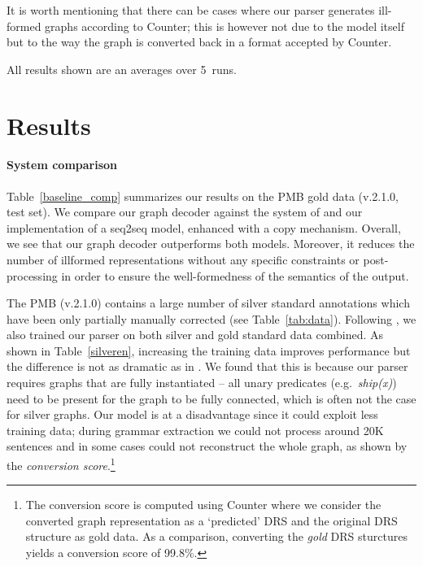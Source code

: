 \documentclass[11pt,a4paper]{article}
\theoremstyle{plain}
\begin{document}
It is worth mentioning that there can be cases where our parser generates ill-formed graphs according to Counter; this is however not due to the model itself but to the way the graph is converted back in a format accepted by Counter.

All results shown are an averages over 5~runs.

\section{Results}
\label{sec:results}

\paragraph{System comparison}
Table~\ref{baseline_comp} summarizes our results on the PMB gold data
(v.2.1.0, test set). We compare our graph decoder against the system
of \citet{van2018exploring} and our implementation of a seq2seq model,
enhanced with a copy mechanism. Overall, we see that our graph decoder
outperforms both models. Moreover, it reduces the number of illformed
representations without any specific constraints or post-processing in
order to ensure the well-formedness of the semantics of the output.

The PMB (v.2.1.0) contains a large
number of silver standard annotations which have been only partially
manually corrected (see Table~\ref{tab:data}). Following
\citet{van2018exploring}, we also trained our parser on both silver
and gold standard data combined. As shown in Table~\ref{silveren},
increasing the training data improves performance but the difference is not as dramatic as in \citet{van2018exploring}. 
We found that this is because our parser requires graphs that are fully instantiated -- all unary predicates (e.g.~\textit{ship(x)}) need to be present for the graph to be fully connected, which is often not the case for silver graphs. Our model is at a disadvantage since it could exploit less
training data; during grammar extraction we could not process around 20K sentences and in some cases could not reconstruct the whole graph,
as shown by the \textit{conversion score}.\footnote{The conversion score is computed using Counter where we consider the converted graph representation as a `predicted' DRS and the original DRS structure as gold data. As a comparison, converting the \textit{gold} DRS sturctures yields a conversion score of 99.8\%.}
\end{document}
